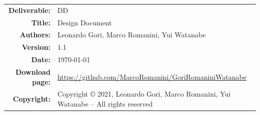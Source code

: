 


\begin{table}[H]
    \setlength\arrayrulewidth{1pt}
    \centering
    \begin{tabular}{rl}
        \hline
        \textbf{Deliverable:} & DD\\
        \textbf{Title:} & Design Document \\
        \textbf{Authors:} & Leonardo Gori, Marco Romanini, Yui Watanabe \\
        \textbf{Version:} & 1.1 \\ 
        \textbf{Date:} & \today \\
        \textbf{Download page:} & \url{https://github.com/MarcoRomanini/GoriRomaniniWatanabe} \\
        \textbf{Copyright:} & Copyright © 2021, Leonardo Gori, Marco Romanini, Yui Watanabe – All rights reserved \\
        \hline
    \end{tabular}
\end{table}

\setcounter{page}{2}


\newpage
{}
\tableofcontents
\newpage
{}
\listoffigures
{}
\listoftables

